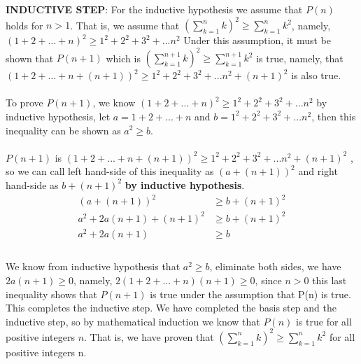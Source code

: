 \documentclass[12pt]{article}
\begin{document}
\textbf{INDUCTIVE STEP}: For the inductive hypothesis we assume that $P(n)$ holds for $n > 1$. That is, we assume that $(\sum\limits_{k=1}^n k)^2  \geq \sum\limits_{k=1}^n k^2 $, namely, $(1 + 2 + ... + n)^2 \geq 1^2 + 2^2 + 3^2 + ... n^2 $
Under this assumption, it must be shown that $P(n + 1)$ which is $(\sum\limits_{k=1}^{n+1} k)^2  \geq \sum\limits_{k=1}^{n+1} k^2 $ is true, namely, that $(1 + 2 + ... + n + (n+1))^2 \geq 1^2 + 2^2 + 3^2 + ... n^2 + (n+1)^2 $ is also true.\\\\
To prove $P(n+1)$, we know  $(1 + 2 + ... + n)^2 \geq 1^2 + 2^2 + 3^2 + ... n^2 $ by inductive hypothesis, let $a = 1 + 2 + ... + n $ and $b = 1^2 + 2^2 + 3^2 + ... n^2$, then this inequality can be shown as $a^2 \geq b$.\\\\
$P(n+1)$ is $(1 + 2 + ... + n + (n+1))^2 \geq 1^2 + 2^2 + 3^2 + ... n^2 + (n+1)^2 $ , so we can call left hand-side of this inequality as $(a + (n+1))^2$ and  right hand-side as $b + (n+1)^2$  \textbf{by inductive hypothesis}.\\
\begin{equation*}
\begin{split}
(a + (n+1))^2  			 &\geq  b + (n+1)^2  \\
a^2 + 2a(n+1) + (n+1)^2	 &\geq  b + (n+1)^2 \\
a^2 + 2a(n+1)			 &\geq  b \\
\end{split}	 
\end{equation*} \\ 
We know from inductive hypothesis that $a^2 \geq b$, eliminate both sides, we have $2a(n+1) \geq 0$, namely, $2(1 + 2 + ... + n)(n+1) \geq 0$, since $n > 0$ this last inequality shows that $P(n + 1)$ is true under the assumption that P(n) is true. This
completes the inductive step. We have completed the basis step and the inductive step, so by mathematical induction we know that $P(n)$ is true for all positive integers $n$. That is, we have proven that $(\sum\limits_{k=1}^n k)^2  \geq \sum\limits_{k=1}^n k^2 $ for all positive integers n.
\end{document}
